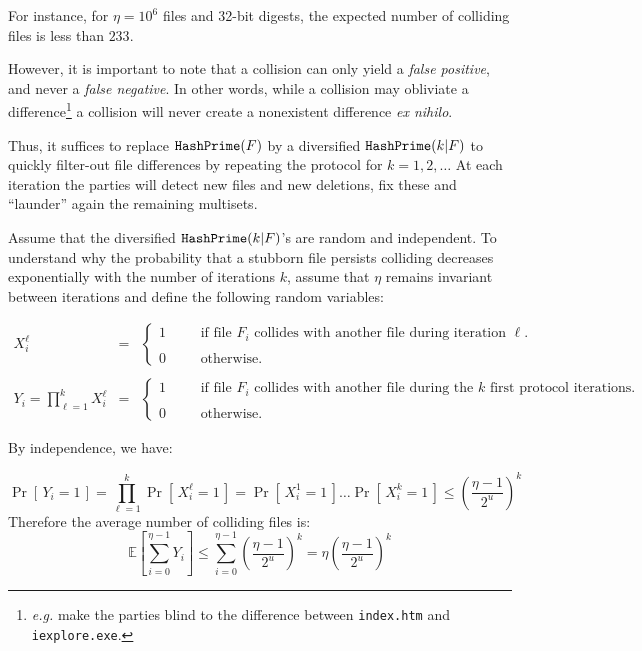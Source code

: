 \documentclass[11pt]{llncs}
\newcommand{\Prob}[1]{{\Pr\left[\,{#1}\,\right]}}
\newcommand{\EE}[1]{{\mathbb{E}\left[{#1}\right]}}
\begin{document}
For instance, for $\eta=10^6$ files and 32-bit digests, the expected number of colliding files is less than $233$.\smallskip

However, it is important to note that a collision can only yield a {\sl false positive}, and never a {\sl false negative}. In other words, while a collision may obliviate a difference\footnote{{\sl e.g.} make the parties blind to the difference between {\tt index.htm} and {\tt iexplore.exe}.} a collision will never create a nonexistent difference {\sl ex nihilo}.\smallskip

Thus, it suffices to replace $\mbox{{\tt HashPrime}}(F)$ by a diversified $\mbox{{\tt HashPrime}}(k|F)$ to quickly filter-out file differences by repeating the protocol for $k=1,2,\ldots$ At each iteration the parties will detect new files and new deletions, fix these and ``launder'' again the remaining multisets.\smallskip

Assume that the diversified $\mbox{{\tt HashPrime}}(k|F)$'s are random and independent. To understand why the probability that a stubborn file persists colliding decreases exponentially with the number of iterations $k$, assume that $\eta$ remains invariant between iterations and define the following random variables:\smallskip

$$
\begin{array}{rcl}
X^{\ell}_i & = &
\left\{
\begin{array}{lcl}
1 & ~~~~&  \mbox{if file $F_i$ collides with another file during iteration $\ell$.}\\
\\
0 & ~~~~&  \mbox{otherwise.}
\end{array}
\right.\\
\\
Y_i = \prod_{\ell=1}^k X^{\ell}_i & = &
\left\{
\begin{array}{lcl}
1 & ~~~~&  \mbox{if file $F_i$ collides with another file during the $k$ first protocol iterations.}\\
\\
0 & ~~~~&  \mbox{otherwise.}
\end{array}
\right.
\end{array}$$

By independence, we have:

 \[ \Prob{Y_i = 1} = \prod_{\ell=1}^k \Prob{X^{\ell}_i = 1} = \Prob{X^1_i = 1} \dots \Prob{X^k_i = 1} \le \left( \frac{\eta -1}{2^u} \right)^k \]
Therefore the average number of colliding files is:
\[
 \EE{\sum_{i=0}^{\eta-1} Y_i} \le \sum_{i=0}^{\eta-1} \left( \frac{\eta -1}{2^u} \right)^k =  \eta \left(\frac{\eta - 1}{2^u}\right)^k
\]
\end{document}
